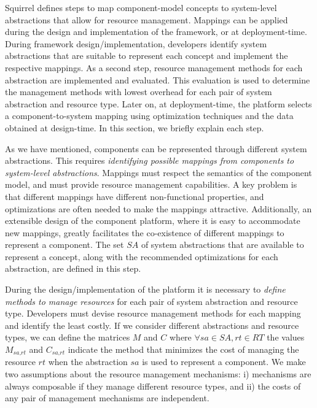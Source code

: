 Squirrel defines steps to map component-model concepts to system-level abstractions that allow for resource management. Mappings can be applied during the design and implementation of the framework, or at deployment-time.
During framework design/implementation, developers identify system abstractions that are suitable to represent each concept and implement the respective mappings.
As a second step, resource management methods for each abstraction are implemented and evaluated.
This evaluation is used to determine the management methods with lowest overhead for each pair of system abstraction and resource type.
Later on, at deployment-time, the platform selects a component-to-system mapping using optimization techniques and the data obtained at design-time.
In this section, we briefly explain each step.

As we have mentioned, components can be represented through different system abstractions. %
This requires \textit{identifying possible mappings from components to system-level abstractions}.
Mappings must respect the semantics of the component model, and %
must provide resource management capabilities.
A key problem is that different mappings have different non-functional properties, and optimizations are often needed to make the mappings attractive. %
Additionally, an extensible design of the component platform, where it is easy to accommodate new mappings, greatly facilitates the co-existence of different mappings to represent a component. 
The set $ \textit{SA} $ of system abstractions that are available to represent a concept, along with the recommended optimizations for each abstraction, are defined in this step.

During the design/implementation of the platform it is necessary to \textit{define methods to manage resources} for each pair of system abstraction and resource type.
Developers must devise resource management methods for each mapping
 and identify the least costly.
If we consider different abstractions and resource types, we can define the matrices $ M $ and $ C $ where
$ \forall{\textit{sa} \in \textit{SA}, \textit{rt} \in \textit{RT}} $ the values
$  M_{\textit{sa}, \textit{rt}} $ and $ C_{\textit{sa}, \textit{rt}} $ indicate the method that minimizes the cost of managing the resource $ \textit{rt} $ when the abstraction $ \textit{sa} $ is used to represent a component. %
We make two assumptions about the resource management mechanisms: i) mechanisms are always composable if they manage different resource types, and ii) the costs of any pair of management mechanisms are independent.

